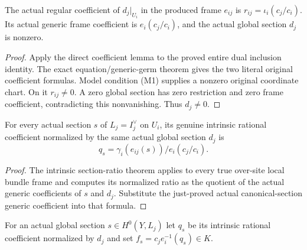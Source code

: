 \begin{theorem}
\label{thm:seven-native-original-pole-section-coefficient}
\leanok
The actual regular coefficient of $d_j|_{U_i}$ in the produced frame
$e_{ij}$ is $r_{ij}=\iota_i(c_j/c_i)$. Its actual generic frame coefficient
is $e_i(c_j/c_i)$, and the actual global section $d_j$ is nonzero.
\end{theorem}
\begin{proof}
Apply the direct coefficient lemma to the proved entire dual inclusion
identity. The exact equation/generic-germ theorem gives the two literal
original coefficient formulas. Model condition (M1) supplies a nonzero
original coordinate chart. On it $r_{ij}\ne0$. A zero global section has
zero restriction and zero frame coefficient, contradicting this
nonvanishing. Thus $d_j\ne0$.
\end{proof}

\begin{theorem}
\label{thm:seven-native-original-section-ratio}
\leanok
For every actual section $s$ of $L_j=I_j^\vee$ on $U_i$, its genuine
intrinsic rational coefficient normalized by the same actual global
section $d_j$ is
\[
 q_s=\gamma_i(e_{ij}(s))/e_i(c_j/c_i).
\]
\end{theorem}
\begin{proof}
The intrinsic section-ratio theorem applies to every true over-site local
bundle frame and computes its normalized ratio as the quotient of the
actual generic coefficients of $s$ and $d_j$. Substitute the just-proved
actual canonical-section generic coefficient into that formula.
\end{proof}

\begin{definition}
\label{def:seven-native-original-global-section-coefficient}
\leanok
For an actual global section $s\in H^0(Y,L_j)$ let $q_s$ be its intrinsic
rational coefficient normalized by $d_j$ and set $f_s=c_j e_i^{-1}(q_s)\in K$.
\end{definition}

